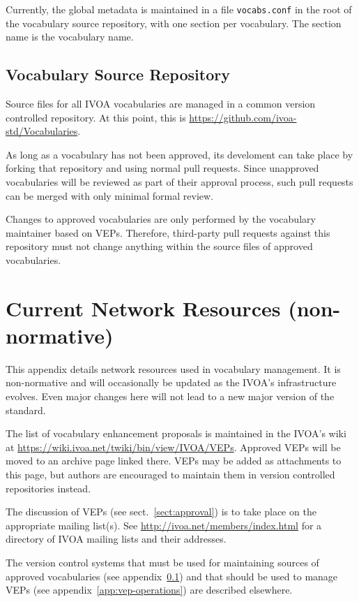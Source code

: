 \documentclass[11pt,a4paper]{ivoa}
\begin{document}
Currently, the global metadata is maintained in a file
\verb|vocabs.conf| in the root of the vocabulary source repository, with one
section per vocabulary.  The section name is the vocabulary name.

\subsection{Vocabulary Source Repository}
\label{app:srcrepo}

Source files for all IVOA vocabularies are managed in a common version
controlled repository.  At this point, this is
\url{https://github.com/ivoa-std/Vocabularies}.

As long as a vocabulary has not been approved, its develoment can
take place by forking that repository and using normal pull requests.
Since unapproved vocabularies will be reviewed as part of their approval
process, such pull requests can be merged with only minimal formal
review.

Changes to approved vocabularies are only performed by the vocabulary
maintainer based on VEPs.  Therefore, third-party pull requests against
this repository must not change anything within the source files of
approved vocabularies.


\section{Current Network Resources (non-normative)}
\label{app:curtech}

This appendix details network resources used in vocabulary management.
It is non-normative and will occasionally be updated as the IVOA's
infrastructure evolves.  Even major changes here will not lead to a new
major version of the standard.

The list of vocabulary enhancement proposals is maintained in the IVOA's
wiki at
\url{https://wiki.ivoa.net/twiki/bin/view/IVOA/VEPs}.
Approved VEPs will be moved to an archive page linked there.
VEPs may be added as attachments to this page, but authors are
encouraged to maintain them in version controlled repositories instead.

The discussion of VEPs (see sect.~\ref{sect:approval}) is to take place
on the appropriate  mailing list(s).  See
\url{http://ivoa.net/members/index.html} for a directory of IVOA mailing
lists and their addresses.

The version control systems that must be used for maintaining sources
of approved vocabularies (see appendix~\ref{app:srcrepo}) and that
should be used to manage VEPs (see appendix~\ref{app:vep-operations})
are described elsewhere.
\end{document}
